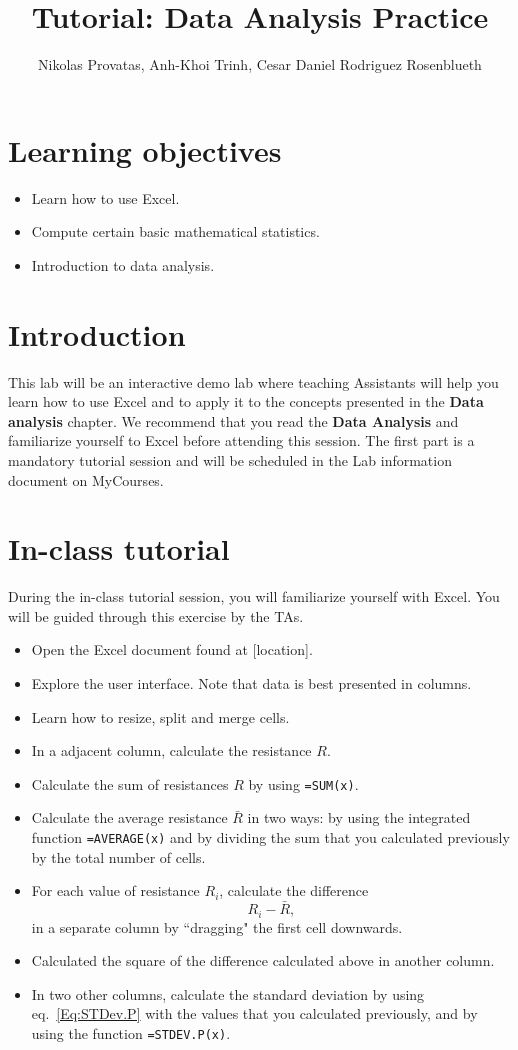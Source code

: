 \documentclass[12pt]{article}
\title{Tutorial: Data Analysis Practice}
\author{Nikolas Provatas, Anh-Khoi Trinh, Cesar Daniel Rodriguez Rosenblueth}
\date{}
\def\anhkhoi#1{{\color{olive}[#1]}}
\begin{document}
\maketitle

\section{Learning objectives}
\begin{itemize}
\item Learn how to use Excel.
\item Compute certain basic mathematical statistics.
\item Introduction to data analysis.
\end{itemize}

\section{Introduction}
This lab will be an interactive demo lab where teaching Assistants will help you  learn how to use Excel and to apply it to the concepts presented in the \textbf{Data analysis} chapter. We recommend that you read the \textbf{Data Analysis} and familiarize yourself to Excel before attending this session. The first part is a mandatory tutorial session and will be scheduled in the Lab information document on MyCourses.

\section{In-class tutorial}
During the in-class tutorial session, you will familiarize yourself with Excel. You will be guided through this exercise by the TAs.

\begin{itemize}
\item Open the Excel document found at \anhkhoi{location}.
\item Explore the user interface. Note that data is best presented in columns.
\item Learn how to resize, split and merge cells.
\item In a adjacent column, calculate the resistance $R$. 
\item Calculate the sum of resistances $R$ by using  \verb|=SUM(x)|.
\item Calculate the average resistance $\bar{R}$ in two ways: by using the integrated function  \verb|=AVERAGE(x)| and by dividing the sum that you calculated previously by the total number of cells.
\item For each value of resistance $R_i$, calculate the difference
\begin{equation}
R_i - \bar{R},
\end{equation}
in a separate column by ``dragging" the first cell downwards.

\item Calculated the square of the difference calculated above in another column.
\item In two other columns, calculate the standard deviation by using eq.~\eqref{Eq:STDev.P} with the values that you calculated previously, and by using the function \verb|=STDEV.P(x)|. 
\end{itemize}
\end{document}
